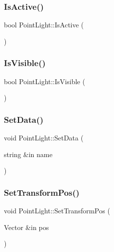 \hypertarget{class_point_light_a059544a6a902cffd4f42c7240da2dd3e}{}\label{class_point_light_a059544a6a902cffd4f42c7240da2dd3e} 
\subsubsection{\texorpdfstring{Is\+Active()}{IsActive()}}
{\footnotesize\ttfamily bool Point\+Light\+::\+Is\+Active (\begin{DoxyParamCaption}{ }\end{DoxyParamCaption})}

\hypertarget{class_point_light_ad865095cebf47c5204589e7bb945ae3f}{}\label{class_point_light_ad865095cebf47c5204589e7bb945ae3f} 
\subsubsection{\texorpdfstring{Is\+Visible()}{IsVisible()}}
{\footnotesize\ttfamily bool Point\+Light\+::\+Is\+Visible (\begin{DoxyParamCaption}{ }\end{DoxyParamCaption})}

\hypertarget{class_point_light_aa7d36cabae373fd963b02c98b6004175}{}\label{class_point_light_aa7d36cabae373fd963b02c98b6004175} 
\subsubsection{\texorpdfstring{Set\+Data()}{SetData()}}
{\footnotesize\ttfamily void Point\+Light\+::\+Set\+Data (\begin{DoxyParamCaption}\item[{string \&in}]{name }\end{DoxyParamCaption})}

\hypertarget{class_point_light_aeb14dfb0ece8a0b53b9749071b0713b2}{}\label{class_point_light_aeb14dfb0ece8a0b53b9749071b0713b2} 
\subsubsection{\texorpdfstring{Set\+Transform\+Pos()}{SetTransformPos()}}
{\footnotesize\ttfamily void Point\+Light\+::\+Set\+Transform\+Pos (\begin{DoxyParamCaption}\item[{Vector \&in}]{pos }\end{DoxyParamCaption})}

